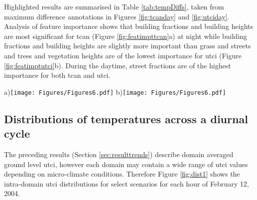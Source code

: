 \documentclass[final,3p,times,authoryear]{elsarticle}
\newcommand{\remove}[1]{\textcolor{red}{\st{}}}
\begin{document}
Highlighted results are summarised in Table \ref{tab:tempDiffs}, taken from maximum difference annotations in Figures \ref{fig:tcanday} and \ref{fig:utciday}. Analysis of feature importance shows that building fractions and building heights are most significant for \gls{tcan} (Figure \ref{fig:featimpttcan}a) at night while building fractions and building heights are slightly more important than grass and streets and trees and vegetation heights are of the lowest importance for \gls{utci} (Figure  \ref{fig:featimptutci}b). During the daytime, street fractions are of the highest importance for both \gls{tcan} and \gls{utci}.

\begin{figure*}
\centering
{\tiny a)}\texttt{[image: Figures/Figures6.pdf]}
{\tiny b)}\texttt{[image: Figures/Figures6.pdf]}\\
\caption{\bf Feature importance in a) \gls{tcan} and b) \gls{utci} for the four surface fractions of streets, buildings, trees, and grass and average heights of vegetation and buildings across February 12, 2004.}
\label{fig:featimpttcan}
\label{fig:featimptutci}
\end{figure*}

\subsection{Distributions of temperatures across a diurnal cycle}\label{sec:resultsdist}

The preceding results (Section \ref{sec:resulttrends}) describe domain averaged ground level \gls{utci}, however each domain may contain a wide range of \gls{utci} values depending on micro-climate conditions. Therefore Figure \ref{fig:dist1} shows the intra-domain \gls{utci} distributions for select scenarios for each hour of February 12, 2004.\remove{Figure fig:dist1 shows the utci distributions for a number of selected scenarios across the 24 hours of February 12, 2004. The preceding results (Section sec:resulttrends) are based on mean values, averaged across the ground level results across each domain. However, different mixes of surface fractions and average heights result in widely varying distributions of temperatures (all in $^{\circ}$C).}
\end{document}
